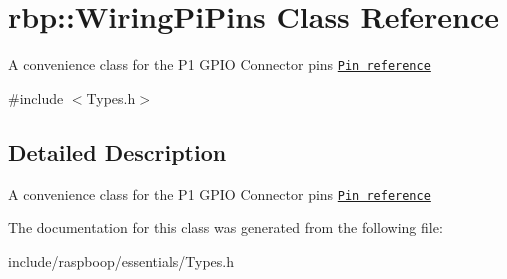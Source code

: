 \hypertarget{classrbp_1_1WiringPiPins}{}\section{rbp\+:\+:Wiring\+Pi\+Pins Class Reference}
\label{classrbp_1_1WiringPiPins}


A convenience class for the P1 G\+P\+I\+O Connector pins \href{http://wiringpi.com/pins/}{\tt Pin reference}  




{\ttfamily \#include $<$Types.\+h$>$}



\subsection{Detailed Description}
A convenience class for the P1 G\+P\+I\+O Connector pins \href{http://wiringpi.com/pins/}{\tt Pin reference} 

The documentation for this class was generated from the following file\+:\begin{DoxyCompactItemize}
\item 
include/raspboop/essentials/Types.\+h\end{DoxyCompactItemize}
